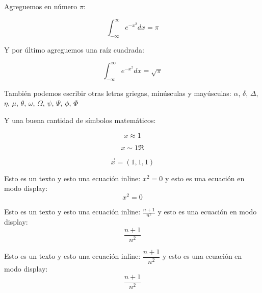 \documentclass{article}
\begin{document}
Agreguemos en número $\pi$: 

\begin{equation}
    \int_{-\infty}^{\infty}e^{-x^{2}} dx = \pi
\end{equation}

Y por último agreguemos una raíz cuadrada:

\begin{equation}
    \int_{-\infty}^{\infty}e^{-x^{2}} dx = \sqrt{\pi}
\end{equation}

También podemos escribir otras letras griegas, minúsculas y mayúsculas: $\alpha$, $\delta$, $\Delta$, $\eta$, $\mu$, $\theta$, $\omega$, $\Omega$, $\psi$, $\Psi$, $\phi$, $\Phi$

Y una buena cantidad de símbolos matemáticos:

\begin{equation}
    x \approx 1
\end{equation}

\begin{equation}
    x \sim 1 \Re
\end{equation}

\begin{equation}
    \vec{x} =(1,1,1)
\end{equation}

Esto es un texto y esto una ecuación inline: $x^{2}=0$
y esto es una ecuación en modo display:
\begin{equation}
    x^{2}=0
\end{equation}

Esto es un texto y esto una ecuación inline: $\frac{n+1}{n^2}$
y esto es una ecuación en modo display:
\begin{equation}
    \frac{n+1}{n^2}
\end{equation}

Esto es un texto y esto una ecuación inline: $\dfrac{n+1}{n^2}$
y esto es una ecuación en modo display:
\begin{equation}
    \dfrac{n+1}{n^2}
\end{equation}
\end{document}
